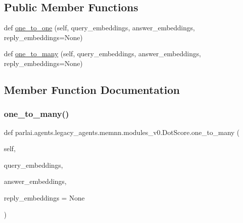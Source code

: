 \subsection*{Public Member Functions}
\begin{DoxyCompactItemize}
\item 
def \hyperlink{classparlai_1_1agents_1_1legacy__agents_1_1memnn_1_1modules__v0_1_1DotScore_acf84cd9ea66c02103aae3b3ddb78c59e}{one\+\_\+to\+\_\+one} (self, query\+\_\+embeddings, answer\+\_\+embeddings, reply\+\_\+embeddings=None)
\item 
def \hyperlink{classparlai_1_1agents_1_1legacy__agents_1_1memnn_1_1modules__v0_1_1DotScore_a3ce27eeeca048e948546729199007d35}{one\+\_\+to\+\_\+many} (self, query\+\_\+embeddings, answer\+\_\+embeddings, reply\+\_\+embeddings=None)
\end{DoxyCompactItemize}


\subsection{Member Function Documentation}
\mbox{\label{classparlai_1_1agents_1_1legacy__agents_1_1memnn_1_1modules__v0_1_1DotScore_a3ce27eeeca048e948546729199007d35}} 
\subsubsection{\texorpdfstring{one\+\_\+to\+\_\+many()}{one\_to\_many()}}
{\footnotesize\ttfamily def parlai.\+agents.\+legacy\+\_\+agents.\+memnn.\+modules\+\_\+v0.\+Dot\+Score.\+one\+\_\+to\+\_\+many (\begin{DoxyParamCaption}\item[{}]{self,  }\item[{}]{query\+\_\+embeddings,  }\item[{}]{answer\+\_\+embeddings,  }\item[{}]{reply\+\_\+embeddings = {\ttfamily None} }\end{DoxyParamCaption})}

